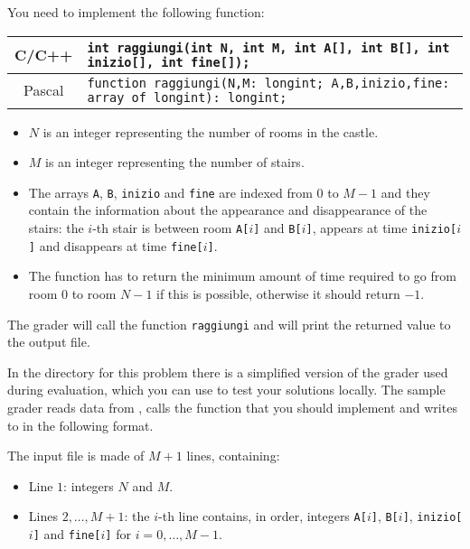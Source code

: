 You need to implement the following function:

\begin{center}\begin{tabularx}{\textwidth}{|c|X|}
\hline
C/C++  & \verb|int raggiungi(int N, int M, int A[], int B[], int inizio[], int fine[]);|\\
\hline
Pascal  & \verb|function raggiungi(N,M: longint; A,B,inizio,fine: array of longint): longint;|\\
\hline
\end{tabularx}\end{center}

\begin{itemize}[nolistsep]
  \item $N$ is an integer representing the number of rooms in the castle.
  \item $M$ is an integer representing the number of stairs.
  \item The arrays \texttt{A}, \texttt{B}, \texttt{inizio} and \texttt{fine} are indexed from $0$ to $M-1$ and they contain the information about the appearance and disappearance of the stairs: the $i$-th stair is between room \texttt{A[$i$]} and \texttt{B[$i$]}, appears at time \texttt{inizio[$i$]} and disappears at time \texttt{fine[$i$]}.
  \item The function has to return the minimum amount of time required to go from room $0$ to room $N-1$ if this is possible, otherwise it should return $-1$.
\end{itemize}

\medskip

The grader will call the function \texttt{raggiungi} and will print the returned value to the output file.



\Grader
In the directory for this problem there is a simplified version of the grader used during evaluation, which you can use to test your solutions locally. The sample grader reads data from , calls the function that you should implement and writes to \outputfile{} in the following format.

The input file is made of $M+1$ lines, containing:
\begin{itemize}[nolistsep,itemsep=2mm]
\item Line $1$: integers $N$ and $M$.
\item Lines $2, \ldots, M+1$: the $i$-th line contains, in order, integers \texttt{A[$i$]}, \texttt{B[$i$]}, \texttt{inizio[$i$]} and \texttt{fine[$i$]} for $i = 0, \ldots, M-1$.
\end{itemize}

